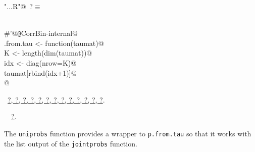 \documentclass[reqno]{amsart}
\renewcommand{\NWtarget}[2]{\hypertarget{#1}{#2}}
\renewcommand{\NWlink}[2]{\hyperlink{#1}{#2}}
\begin{document}
\begin{flushleft} \small
\begin{minipage}{\linewidth}\label{scrap39}\raggedright\small
\NWtarget{nuweb?}{} \verb@"..\R\ExchMultinomial.R"@\nobreak\ {\footnotesize {?}}$\equiv$
\vspace{-1ex}
\begin{list}{}{} \item
\mbox{}\verb@@\\
\mbox{}\verb@#'@{\tt @}\verb@rdname CorrBin-internal@\\
\mbox{}\verb@p.from.tau <- function(taumat){@\\
\mbox{}\verb@  K <- length(dim(taumat))@\\
\mbox{}\verb@  idx <- diag(nrow=K)@\\
\mbox{}\verb@  taumat[rbind(idx+1)]@\\
\mbox{}\verb@}    @\\
\mbox{}\verb@@{\NWsep}
\end{list}
\vspace{-1.5ex}
\footnotesize
\begin{list}{}{\setlength{\itemsep}{-\parsep}\setlength{\itemindent}{-\leftmargin}}
\item \NWtxtFileDefBy\ \NWlink{nuweb?}{?}\NWlink{nuweb?}{, ?}\NWlink{nuweb?}{, ?}\NWlink{nuweb?}{, ?}\NWlink{nuweb?}{, ?}\NWlink{nuweb?}{, ?}\NWlink{nuweb?}{, ?}\NWlink{nuweb?}{, ?}\NWlink{nuweb?}{, ?}\NWlink{nuweb?}{, ?}\NWlink{nuweb?}{, ?}\NWlink{nuweb?}{, ?}\NWlink{nuweb?}{, ?}.
\item \NWtxtIdentsUsed\nobreak\  \verb@tau@\nobreak\ \NWlink{nuweb?}{?}.
\item{}
\end{list}
\end{minipage}\vspace{4ex}
\end{flushleft}
The \texttt{uniprobs} function provides a wrapper to \texttt{p.from.tau} so that it works with the
list output of the \texttt{jointprobs} function.
\end{document}

